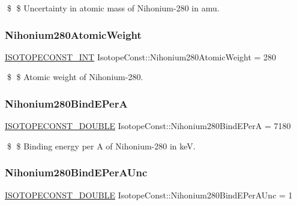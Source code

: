 \$ \$ Uncertainty in atomic mass of Nihonium-\/280 in amu. \mbox{\label{group___isotope_const-_nihonium-_nh280_ga03ca1a055312e3a6db97dd455e921bc6}} 
\subsubsection{\texorpdfstring{Nihonium280\+Atomic\+Weight}{Nihonium280AtomicWeight}}
{\footnotesize\ttfamily \mbox{\hyperlink{group___isotope_const-_macros_ga5f18360b3e99483a35c32d789e62621c}{I\+S\+O\+T\+O\+P\+E\+C\+O\+N\+S\+T\+\_\+\+I\+NT}} Isotope\+Const\+::\+Nihonium280\+Atomic\+Weight = 280}

\$ \$ Atomic weight of Nihonium-\/280. \mbox{\label{group___isotope_const-_nihonium-_nh280_gaca4618e7deef9a349344c12f8a38b817}} 
\subsubsection{\texorpdfstring{Nihonium280\+Bind\+E\+PerA}{Nihonium280BindEPerA}}
{\footnotesize\ttfamily \mbox{\hyperlink{group___isotope_const-_macros_ga8f45a7272ce02c0b4c65c44636ed719a}{I\+S\+O\+T\+O\+P\+E\+C\+O\+N\+S\+T\+\_\+\+D\+O\+U\+B\+LE}} Isotope\+Const\+::\+Nihonium280\+Bind\+E\+PerA = 7180}

\$ \$ Binding energy per A of Nihonium-\/280 in keV. \mbox{\label{group___isotope_const-_nihonium-_nh280_ga9fb817bb361c51ce882649c4e6c122c6}} 
\subsubsection{\texorpdfstring{Nihonium280\+Bind\+E\+Per\+A\+Unc}{Nihonium280BindEPerAUnc}}
{\footnotesize\ttfamily \mbox{\hyperlink{group___isotope_const-_macros_ga8f45a7272ce02c0b4c65c44636ed719a}{I\+S\+O\+T\+O\+P\+E\+C\+O\+N\+S\+T\+\_\+\+D\+O\+U\+B\+LE}} Isotope\+Const\+::\+Nihonium280\+Bind\+E\+Per\+A\+Unc = 1}

